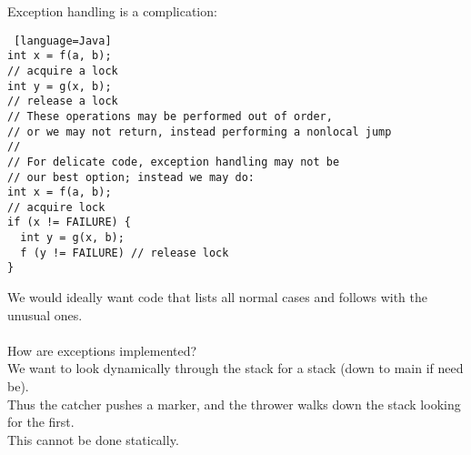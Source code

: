 \documentclass[../../lecture_notes.tex]{subfiles}
\begin{document}
Exception handling is a complication:
\begin{lstlisting} [language=Java]
int x = f(a, b);
// acquire a lock
int y = g(x, b);
// release a lock
// These operations may be performed out of order, 
// or we may not return, instead performing a nonlocal jump
//
// For delicate code, exception handling may not be 
// our best option; instead we may do:
int x = f(a, b);
// acquire lock
if (x != FAILURE) {
  int y = g(x, b);
  f (y != FAILURE) // release lock
}
\end{lstlisting}
We would ideally want code that lists all normal cases and follows with the unusual ones.\\
\\
How are exceptions implemented?\\
\indent We want to look dynamically through the stack for a stack (down to main if need be).\\
\indent Thus the catcher pushes a marker, and the thrower walks down the stack looking for the first.\\
\indent This cannot be done statically.
\end{document}
